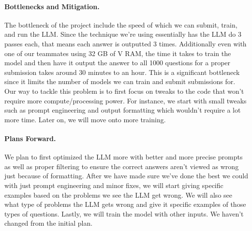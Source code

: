 \documentclass{article}
\begin{document}

\paragraph{Bottlenecks and Mitigation.}
\newline
\newline
The bottleneck of the project include the speed of which we can submit, train, and run the LLM. Since the technique we're using essentially has the LLM do 3 passes each, that means each answer is outputted 3 times. Additionally even with one of our teammates using 32 GB of V RAM, the time it takes to train the model and then have it output the answer to all 1000 questions for a proper submission takes around 30 minutes to an hour. This is a significant bottleneck since it limits the number of models we can train and submit submissions for. Our way to tackle this problem is to first focus on tweaks to the code that won't require more compute/processing power. For instance, we start with small tweaks such as prompt engineering and output formatting which wouldn't require a lot more time. Later on, we will move onto more training. 


\paragraph{Plans Forward.}
We plan to first optimized the LLM more with better and more precise prompts as well as proper filtering to ensure the correct answers aren't viewed as wrong just because of formatting. After we have made sure we've done the best we could with just prompt engineering and minor fixes, we will start giving specific examples based on the problems we see the LLM get wrong. We will also see what type of problems the LLM gets wrong and give it specific examples of those types of questions. Lastly, we will train the model with other inputs. We haven't changed from the initial plan. 
\end{document}
